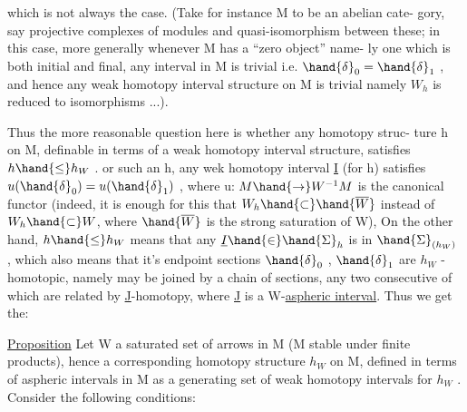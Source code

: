 
which is not always the case. (Take for instance M to be an abelian cate-%
gory,  say projective complexes of modules and quasi-isomorphism between
these;  in this case,  more generally whenever M has a ``zero object'' name-%
ly one which is both initial and final,  any interval in M is trivial i.e.
$\hand{\delta}_0=\hand{\delta}_1$ ,  and hence  any weak homotopy interval structure
on M is trivial namely $W_h$ is reduced to isomorphisms ...).

Thus the more reasonable question here is whether any homotopy struc-%
ture h on M,  definable in terms of a weak homotopy interval structure,
satisfies $h\hand{\leq}h_W$ .  or such an h,  any wek homotopy interval \underline{I} (for  h)
 satisfies  $u(\hand{\delta}_0)=u(\hand{\delta}_1)$ ,  where u: $M\hand{\rightarrow}W^{-1}M$  is the canonical
functor  (indeed,  it is enough  for this that  $W_h\hand{\subset}\hand{\overline{W}}$  instead
of $W_h\hand{\subset}W$,  where $\hand{\overline{W}}$ is the strong saturation of W),  
On the other hand,  $h\hand{\leq}h_W$ means that  any $\underline{I}\hand{\in}\hand{\Sigma}_h$ is in $\hand{\Sigma}_{(h_W)}$ , which \margin{$\times$}
also means that it's endpoint  sections $\hand{\delta}_0$ , $\hand{\delta}_1$ are  $h_W$ -homotopic,
namely may be joined by a chain of sections,  any two consecutive of
which are related by   \underline{J}-homotopy,  where \underline{J} is a W-\uline{aspheric interval}.
Thus we get the:

\uline{Proposition}  Let W a saturated set of arrows in M (M stable under finite
products),  hence a corresponding homotopy structure $h_W$ on M,  defined in
terms of aspheric intervals\hand{*} in M as a generating set of weak homotopy 
intervals for $h_W$ .   Consider the following conditions:

